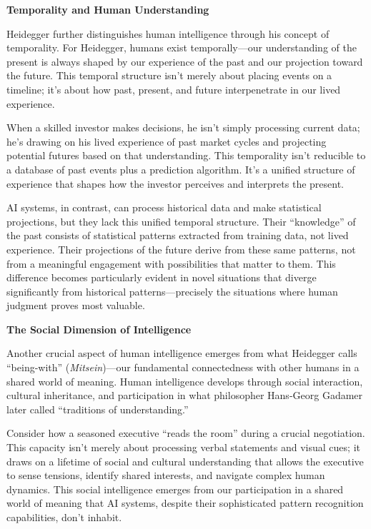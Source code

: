 \documentclass[
  Letterpaper,
]{scrbook}
\begin{document}
\textbf{Temporality and Human Understanding}

Heidegger further distinguishes human intelligence through his concept
of temporality. For Heidegger, humans exist temporally---our
understanding of the present is always shaped by our experience of the
past and our projection toward the future. This temporal structure isn't
merely about placing events on a timeline; it's about how past, present,
and future interpenetrate in our lived experience.

When a skilled investor makes decisions, he isn't simply processing
current data; he's drawing on his lived experience of past market cycles
and projecting potential futures based on that understanding. This
temporality isn't reducible to a database of past events plus a
prediction algorithm. It's a unified structure of experience that shapes
how the investor perceives and interprets the present.

AI systems, in contrast, can process historical data and make
statistical projections, but they lack this unified temporal structure.
Their ``knowledge'' of the past consists of statistical patterns
extracted from training data, not lived experience. Their projections of
the future derive from these same patterns, not from a meaningful
engagement with possibilities that matter to them. This difference
becomes particularly evident in novel situations that diverge
significantly from historical patterns---precisely the situations where
human judgment proves most valuable.

\textbf{The Social Dimension of Intelligence}

Another crucial aspect of human intelligence emerges from what Heidegger
calls ``being-with'' (\emph{Mitsein})---our fundamental connectedness
with other humans in a shared world of meaning. Human intelligence
develops through social interaction, cultural inheritance, and
participation in what philosopher Hans-Georg Gadamer later called
``traditions of understanding.''

Consider how a seasoned executive ``reads the room'' during a crucial
negotiation. This capacity isn't merely about processing verbal
statements and visual cues; it draws on a lifetime of social and
cultural understanding that allows the executive to sense tensions,
identify shared interests, and navigate complex human dynamics. This
social intelligence emerges from our participation in a shared world of
meaning that AI systems, despite their sophisticated pattern recognition
capabilities, don't inhabit.
\end{document}
